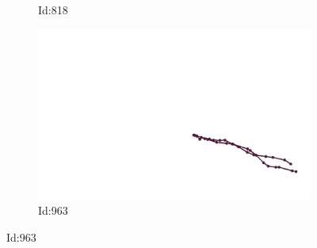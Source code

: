 \documentclass[12pt,twoside]{report}
\begin{document}
\begin{figure}
\begin{subfigure}[b]{0.20\textwidth}
\caption{Id:818}
\end{subfigure}
\begin{subfigure}[b]{0.20\textwidth}
\centering
\includegraphics[width=\textwidth]{../trajectories/963.png}
\caption{Id:963}
\end{subfigure}
\end{figure}
\end{document}
